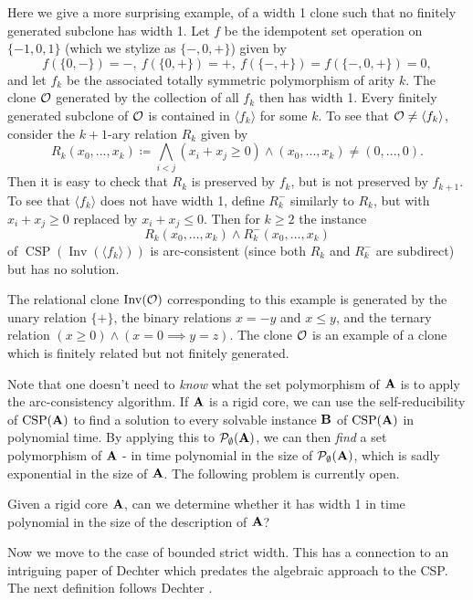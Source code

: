 \documentclass[letterpaper,11pt]{article}
\DeclareMathOperator{\Inv}{Inv}
\DeclareMathOperator{\CSP}{CSP}
\begin{document}
\begin{ex}\label{width-1-not-finitely-gen} Here we give a more surprising example, of a width 1 clone such that no finitely generated subclone has width 1. Let $f$ be the idempotent set operation on $\{-1,0,1\}$ (which we stylize as $\{-,0,+\}$) given by
\[
f(\{0,-\}) = -,\ f(\{0,+\}) = +,\ f(\{-,+\}) = f(\{-,0,+\}) = 0,
\]
and let $f_k$ be the associated totally symmetric polymorphism of arity $k$. The clone $\mathcal{O}$ generated by the collection of all $f_k$ then has width 1. Every finitely generated subclone of $\mathcal{O}$ is contained in $\langle f_k\rangle$ for some $k$. To see that $\mathcal{O} \ne \langle f_k \rangle$, consider the $k+1$-ary relation $R_k$ given by
\[
R_k(x_0, ..., x_k) \coloneqq \bigwedge_{i < j} (x_i + x_j \ge 0) \wedge (x_0, ..., x_k) \ne (0, ..., 0).
\]
Then it is easy to check that $R_k$ is preserved by $f_k$, but is not preserved by $f_{k+1}$. To see that $\langle f_k \rangle$ does not have width 1, define $R_k^-$ similarly to $R_k$, but with $x_i + x_j \ge 0$ replaced by $x_i + x_j \le 0$. Then for $k\ge 2$ the instance
\[
R_k(x_0, ..., x_k) \wedge R_k^-(x_0, ..., x_k)
\]
of $\CSP(\Inv(\langle f_k \rangle))$ is arc-consistent (since both $R_k$ and $R_k^-$ are subdirect) but has no solution.

The relational clone $\Inv(\cO)$ corresponding to this example is generated by the unary relation $\{+\}$, the binary relations $x = -y$ and $x \le y$, and the ternary relation $(x \ge 0) \wedge (x = 0 \implies y = z)$. The clone $\mathcal{O}$ is an example of a clone which is finitely related but not finitely generated.
\end{ex}

Note that one doesn't need to \emph{know} what the set polymorphism of $\mathbf{A}$ is to apply the arc-consistency algorithm. If $\mathbf{A}$ is a rigid core, we can use the self-reducibility of $\CSP(\fA)$ to find a solution to every solvable instance $\mathbf{B}$ of $\CSP(\fA)$ in polynomial time. By applying this to $\mathcal{P}_\emptyset(\mathbf{A})$, we can then \emph{find} a set polymorphism of $\mathbf{A}$ - in time polynomial in the size of $\mathcal{P}_\emptyset(\mathbf{A})$, which is sadly exponential in the size of $\mathbf{A}$. The following problem is currently open.

\begin{prob} Given a rigid core $\mathbf{A}$, can we determine whether it has width 1 in time polynomial in the size of the description of $\mathbf{A}$?
\end{prob}

Now we move to the case of bounded strict width. This has a connection to an intriguing paper of Dechter \cite{dechter} which predates the algebraic approach to the CSP. The next definition follows Dechter \cite{dechter}.
\end{document}
